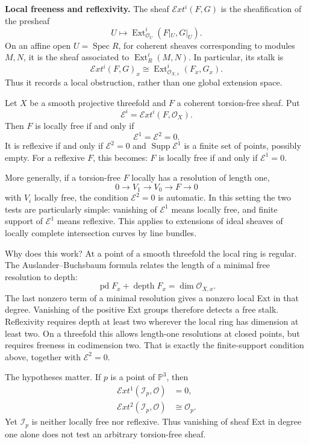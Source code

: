 \medskip\noindent
\textbf{Local freeness and reflexivity.}
The sheaf $\mathcal{E}xt^i(F,G)$ is the
sheafification of the presheaf
$$
U\longmapsto
\operatorname{Ext}^i_{\mathcal{O}_U}
(F|_U,G|_U).
$$
On an affine open $U=\operatorname{Spec}R$,
for coherent sheaves corresponding to
modules $M,N$, it is the sheaf associated
to $\operatorname{Ext}^i_R(M,N)$.
In particular, its stalk is
$$
\mathcal{E}xt^i(F,G)_x
\cong\operatorname{Ext}^i_{\mathcal{O}_{X,x}}
(F_x,G_x).
$$
Thus it records a local obstruction,
rather than one global extension space.

\begin{proposition}
\label{proposition-threefold-sheaf-ext}
Let $X$ be a smooth projective threefold
and $F$ a coherent torsion-free sheaf.
Put
$$
\mathcal{E}^i=
\mathcal{E}xt^i(F,\mathcal{O}_X).
$$
Then $F$ is locally free if and only if
$$
\mathcal{E}^1=\mathcal{E}^2=0.
$$
It is reflexive if and only if
$\mathcal{E}^2=0$ and
$\operatorname{Supp}\mathcal{E}^1$
is a finite set of points, possibly
empty. For a reflexive $F$, this becomes:
$F$ is locally free if and only if
$\mathcal{E}^1=0$.
\end{proposition}

More generally, if a torsion-free $F$
locally has a resolution of length one,
$$
0\longrightarrow V_1\longrightarrow V_0
\longrightarrow F\longrightarrow0
$$
with $V_i$ locally free, the condition
$\mathcal{E}^2=0$ is automatic. In this
setting the two tests are particularly
simple: vanishing of $\mathcal{E}^1$
means locally free, and finite support
of $\mathcal{E}^1$ means reflexive.
This applies to extensions of ideal
sheaves of locally complete intersection
curves by line bundles.

Why does this work? At a point of a
smooth threefold the local ring is
regular. The Auslander--Buchsbaum
formula relates the length of a minimal
free resolution to depth:
$$
\operatorname{pd}F_x+\operatorname{depth}F_x
=\dim\mathcal{O}_{X,x}.
$$
The last nonzero term of a minimal
resolution gives a nonzero local Ext
in that degree. Vanishing of the
positive Ext groups therefore detects
a free stalk. Reflexivity requires
depth at least two wherever the local
ring has dimension at least two.
On a threefold this allows length-one
resolutions at closed points, but
requires freeness in codimension two.
That is exactly the finite-support
condition above, together with
$\mathcal{E}^2=0$.

The hypotheses matter. If $p$ is a
point of $\mathbb{P}^3$, then
$$
\begin{aligned}
\mathcal{E}xt^1
(\mathcal{I}_p,\mathcal{O})&=0,\\
\mathcal{E}xt^2
(\mathcal{I}_p,\mathcal{O})&\cong
\mathcal{O}_p.
\end{aligned}
$$
Yet $\mathcal{I}_p$ is neither locally
free nor reflexive. Thus vanishing of
sheaf Ext in degree one alone does not
test an arbitrary torsion-free sheaf.

